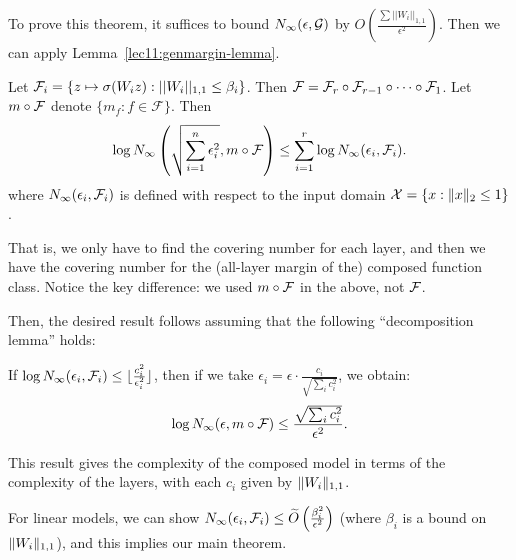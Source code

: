 To prove this theorem, it suffices to bound $N_\infty(\epsilon, \mathcal G)$ by $O(\frac{\sum{||W_i||_{1, 1}}}{\epsilon^2})$. Then we can apply Lemma~\ref{lec11:genmargin-lemma}.

Let $\mathcal F_i = \{ z \mapsto \sigma (W_i z) : ||W_i||_{1, 1} \leq \beta_i \}$. Then $\mathcal F = \mathcal F_r \circ \mathcal F_{r-1} \circ \cdots \circ \mathcal F_1$. Let $m \circ \mathcal F$ denote $\{m_f : f \in \mathcal{F} \}$. Then
\begin{equation}
\log N_\infty\left (\sqrt{\sum_{i=1}^n \epsilon_i^2}, m \circ \mathcal F \right ) \leq \sum_{i=1}^r \log N_\infty(\epsilon_i, \mathcal F_i).
\end{equation}
where $N_\infty(\epsilon_i, \mathcal F_i)$ is defined with respect to the input domain $\mathcal{X} = \{x : \|x\|_2 \leq 1 \}$.

That is, we only have to find the covering number for each layer, and then we have the covering number for the (all-layer margin of the) composed function class. Notice the key difference: we used $m \circ \mathcal F$ in the above, not $\mathcal F$.

Then, the desired result follows assuming that the following ``decomposition lemma'' holds:

\begin{lemma}
    If $\log N_\infty(\epsilon_i, \mathcal F_i) \leq \lfloor \frac{c_i^2}{\epsilon_i^2} \rfloor$, then if we take $\epsilon_i = \epsilon \cdot \frac{c_i}{\sqrt{\sum_i c_i^2}}$, we obtain:
    \begin{equation}
    \log N_\infty(\epsilon, m \circ \mathcal F) \leq \frac{\sqrt{\sum_i c_i^2}}{\epsilon^2}.
    \end{equation}
\end{lemma}
This result gives the complexity of the composed model in terms of the complexity of the layers, with each $c_i$ given by $\|W_i\|_{1, 1}$.

For linear models, we can show $N_\infty(\epsilon_i, \mathcal F_i) \leq \widetilde{O}\left (\frac{\beta_i^2}{\epsilon^2} \right )$ (where $\beta_i$ is a bound on $\|W_i\|_{1, 1}$), and this implies our main theorem.

